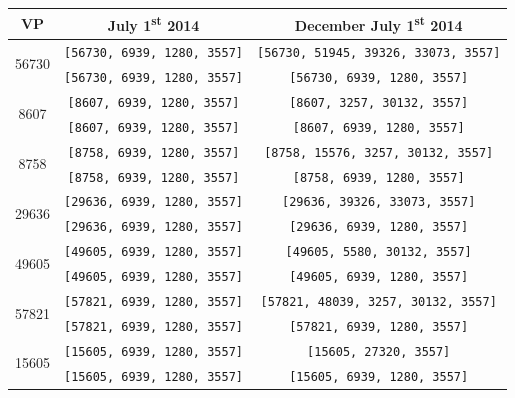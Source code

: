 \begin{table}[!ht]
	\centering
	\begin{tabular}{c c c}
		\hline
		\textbf{VP} & \textbf{July 1\textsuperscript{st} 2014\tnote{a}}	& \textbf{December July 1\textsuperscript{st} 2014\tnote{b}} \\ \hline\hline
		\multirow{2}{*}{56730} & \texttt{\footnotesize [56730, 6939, 1280, 3557]}  & \texttt{\footnotesize [56730, 51945, 39326, 33073, 3557]} \\
		& \texttt{\footnotesize [56730, 6939, 1280, 3557]}  & \texttt{\footnotesize [56730, 6939, 1280, 3557]} \\ \hline
		
		\multirow{2}{*}{8607} & \texttt{\footnotesize [8607, 6939, 1280, 3557]}  & \texttt{\footnotesize [8607, 3257, 30132, 3557]} \\
		& \texttt{\footnotesize [8607, 6939, 1280, 3557]}  & \texttt{\footnotesize [8607, 6939, 1280, 3557]} \\ \hline
		
		\multirow{2}{*}{8758} & \texttt{\footnotesize [8758, 6939, 1280, 3557]}  & \texttt{\footnotesize [8758, 15576, 3257, 30132, 3557]} \\
		& \texttt{\footnotesize[8758, 6939, 1280, 3557]}  & \texttt{\footnotesize[8758, 6939, 1280, 3557]} \\ \hline
		
		\multirow{2}{*}{29636} & \texttt{\footnotesize [29636, 6939, 1280, 3557]}  & \texttt{\footnotesize [29636, 39326, 33073, 3557]} \\
		& \texttt{\footnotesize[29636, 6939, 1280, 3557]}  & \texttt{\footnotesize[29636, 6939, 1280, 3557]} \\ \hline
		
		\multirow{2}{*}{49605} & \texttt{\footnotesize [49605, 6939, 1280, 3557]}  & \texttt{\footnotesize [49605, 5580, 30132, 3557]} \\
		& \texttt{\footnotesize[49605, 6939, 1280, 3557]}  & \texttt{\footnotesize[49605, 6939, 1280, 3557]} \\ \hline
		
		\multirow{2}{*}{57821} & \texttt{\footnotesize [57821, 6939, 1280, 3557]}  & \texttt{\footnotesize [57821, 48039, 3257, 30132, 3557]} \\
		& \texttt{\footnotesize[57821, 6939, 1280, 3557]}  & \texttt{\footnotesize[57821, 6939, 1280, 3557]} \\ \hline
		
		\multirow{2}{*}{15605} & \texttt{\footnotesize [15605, 6939, 1280, 3557]}  & \texttt{\footnotesize [15605, 27320, 3557]} \\
		& \texttt{\footnotesize[15605, 6939, 1280, 3557]}  & \texttt{\footnotesize[15605, 6939, 1280, 3557]} \\ \hline
		

\end{tabular}
\end{table}
